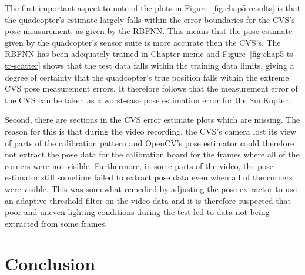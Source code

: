 The first important aspect to note of the plots in Figure~\ref{fig:chap5-results} is that the quadcopter's estimate largely falls within the error boundaries for the CVS's pose measurement, as given by the RBFNN. This means that the pose estimate given by the quadcopter's sensor suite is more accurate then the CVS's. The RBFNN has been adequately trained in Chapter meme and Figure~\ref{fig:chap5-ts-tr-scatter} shows that the test data falls within the training data limits, giving a degree of certainty that the quadcopter's true position falls within the extreme CVS pose measurement errors. It therefore follows that the measurement error of the CVS can be taken as a worst-case pose estimation error for the SunKopter. 

Second, there are sections in the CVS error estimate plots which are missing. The reason for this is that during the video recording, the CVS's camera lost its view of parts of the calibration pattern and OpenCV's pose estimator could therefore not extract the pose data for the calibration board for the frames where all of the corners were not visible. Furthermore, in some parts of the video, the pose estimator still sometime failed to extract pose data even when all of the corners were visible. This was somewhat remedied by adjusting the pose extractor to use an adaptive threshold filter on the video data and it is therefore suspected that poor and uneven lighting conditions during the test led to data not being extracted from some frames. 

\section{Conclusion}



